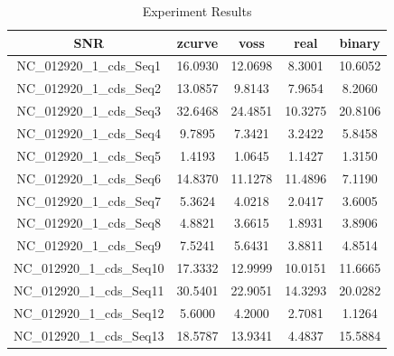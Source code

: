 \documentclass[conference]{IEEEtran}
\begin{document}
\begin{table}[H]\label{result1}
\scriptsize
\centering
\caption{Experiment Results}
\begin{tabular}{|c|c|c|c|c|}
\hline
{\color[HTML]{000000} SNR} & {\color[HTML]{000000} zcurve} & {\color[HTML]{000000} voss} & {\color[HTML]{000000} real} & {\color[HTML]{000000} binary} \\ \hline
NC\_012920\_1\_cds\_Seq1   & 16.0930                       & 12.0698                     & 8.3001                      & 10.6052                       \\ \hline
NC\_012920\_1\_cds\_Seq2   & 13.0857                       & 9.8143                      & 7.9654                      & 8.2060                        \\ \hline
NC\_012920\_1\_cds\_Seq3   & 32.6468                       & 24.4851                     & 10.3275                     & 20.8106                       \\ \hline
NC\_012920\_1\_cds\_Seq4   & 9.7895                        & 7.3421                      & 3.2422                      & 5.8458                        \\ \hline
NC\_012920\_1\_cds\_Seq5   & 1.4193                        & 1.0645                      & 1.1427                      & 1.3150                        \\ \hline
NC\_012920\_1\_cds\_Seq6   & 14.8370                       & 11.1278                     & 11.4896                     & 7.1190                        \\ \hline
NC\_012920\_1\_cds\_Seq7   & 5.3624                        & 4.0218                      & 2.0417                      & 3.6005                        \\ \hline
NC\_012920\_1\_cds\_Seq8   & 4.8821                        & 3.6615                      & 1.8931                      & 3.8906                        \\ \hline
NC\_012920\_1\_cds\_Seq9   & 7.5241                        & 5.6431                      & 3.8811                      & 4.8514                        \\ \hline
NC\_012920\_1\_cds\_Seq10  & 17.3332                       & 12.9999                     & 10.0151                     & 11.6665                       \\ \hline
NC\_012920\_1\_cds\_Seq11  & 30.5401                       & 22.9051                     & 14.3293                     & 20.0282                       \\ \hline
NC\_012920\_1\_cds\_Seq12  & 5.6000                        & 4.2000                      & 2.7081                      & 1.1264                        \\ \hline
NC\_012920\_1\_cds\_Seq13  & 18.5787                       & 13.9341                     & 4.4837                      & 15.5884                       \\ \hline
\end{tabular}
\end{table}
\end{document}
